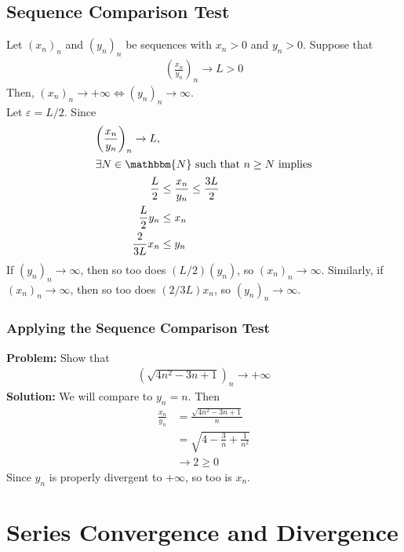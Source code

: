 \documentclass[10pt]{extarticle}
\newcommand{\N}{\mathbbm{N}}
\begin{document}
  \subsection{Sequence Comparison Test}%
    Let $(x_n)_n$ and $(y_n)_n$ be sequences with $x_n > 0$ and $y_n > 0$. Suppose that 
    \begin{align*}
      \left(\frac{x_n}{y_n}\right)_n \rightarrow L > 0
    \end{align*}
    Then, $(x_n)_n \rightarrow +\infty \Leftrightarrow (y_n)_n \rightarrow \infty$.\\

    Let $\varepsilon = L/2$. Since
    \begin{align*}
      \left(\frac{x_n}{y_n}\right)_n \rightarrow L,\\
      \shortintertext{$\exists N \in\N$ such that $n\geq N$ implies}
      \frac{L}{2} &\leq \frac{x_n}{y_n} \leq \frac{3L}{2}\\
      \frac{L}{2}y_n  &\leq x_n\\
      \frac{2}{3L}x_n &\leq y_n
    \end{align*}
    If $(y_n)_n \rightarrow \infty$, then so too does $(L/2)(y_n)$, so $(x_n)_n\rightarrow\infty$. Similarly, if $(x_n)_n\rightarrow\infty$, then so too does $(2/3L)x_n$, so $(y_n)_n\rightarrow\infty$.\\
  \subsubsection{Applying the Sequence Comparison Test}%
  \textbf{Problem:} Show that
    \begin{align*}
      \left(\sqrt{4n^2 -3n + 1}\right)_n \rightarrow +\infty
    \end{align*}
    \textbf{Solution:} We will compare to $y_n = n$. Then
    \begin{align*}
      \frac{x_n}{y_n} &= \frac{\sqrt{4n^2-3n+1}}{n}\\
                      &= \sqrt{4 - \frac{3}{n} + \frac{1}{n^2}}\\
                      &\rightarrow 2 \geq 0
    \end{align*}
    Since $y_n$ is properly divergent to $+\infty$, so too is $x_n$.
  \section{Series Convergence and Divergence}%
\end{document}
